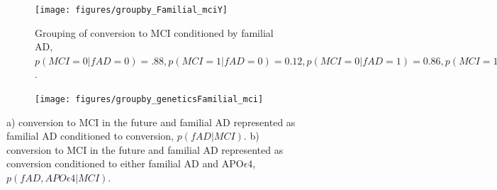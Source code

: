 \documentclass[11pt]{article}
\theoremstyle{definition}
\theoremstyle{remark}
\begin{document}


\begin{figure}[H]
    \centering
    
    \begin{subfigure}[t]{0.45\textwidth}
        \centering
        \texttt{[image: figures/groupby\_Familial\_mciY]}
        \caption{Grouping of conversion to MCI conditioned by familial AD,$p(MCI=0|fAD=0)=.88, p(MCI=1|fAD=0)=0.12, p(MCI=0|fAD=1)=0.86, p(MCI=1|fAD=1)=0.14$. }
    \end{subfigure}
    \begin{subfigure}[t]{0.45\textwidth}
        \centering
        \texttt{[image: figures/groupby\_geneticsFamilial\_mci]}
        \caption{ }
    \end{subfigure}
   
    \caption{a) conversion to MCI in the future and familial AD  represented as familial AD conditioned to conversion, $p(fAD|MCI)$. b) conversion to MCI in the future and familial AD represented as conversion conditioned to either familial AD and APO$\epsilon4$, $p(fAD, APO\epsilon4|MCI)$.}
    \label{fig:genfami}
\end{figure}
\end{document}
